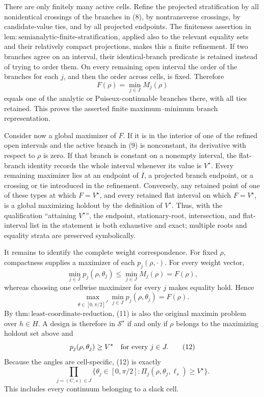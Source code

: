 There are only finitely many active cells.  Refine the projected stratification by all nonidentical crossings of the branches in (8), by nontransverse crossings, by candidate-value ties, and by all projected endpoints.  The finiteness assertion in \(\mathrm{lem{:}semianalytic\mbox{-}finite\mbox{-}stratification}\), applied also to the relevant equality sets and their relatively compact projections, makes this a finite refinement.  If two branches agree on an interval, their identical-branch predicate is retained instead of trying to order them.  On every remaining open interval the order of the branches for each \(j\), and then the order across cells, is fixed.  Therefore
\[
F(\rho)=\min_{j\in J}M_j(\rho)                                    \tag{9}
\]
equals one of the analytic or Puiseux-continuable branches there, with all ties retained.  This proves the asserted finite maximum--minimum branch representation.

Consider now a global maximizer of \(F\).  If it is in the interior of one of the refined open intervals and the active branch in (9) is nonconstant, its derivative with respect to \(\rho\) is zero.  If that branch is constant on a nonempty interval, the flat-branch identity records the whole interval whenever its value is \(V^{\star}\).  Every remaining maximizer lies at an endpoint of \(I\), a projected branch endpoint, or a crossing or tie introduced in the refinement.  Conversely, any retained point of one of these types at which \(F=V^{\star}\), and every retained flat interval on which \(F=V^{\star}\), is a global maximizing holdout by the definition of \(V^{\star}\).  Thus, with the qualification ``attaining \(V^{\star}\)'', the endpoint, stationary-root, intersection, and flat-interval list in the statement is both exhaustive and exact; multiple roots and equality strata are preserved symbolically.

It remains to identify the complete weight correspondence.  For fixed \(\rho\), compactness supplies a maximizer of each \(p_j(\rho,\cdot)\).  For every weight vector,
\[
\min_{j\in J}p_j(\rho,\theta_j)
\leq \min_{j\in J}M_j(\rho)=F(\rho),                              \tag{10}
\]
whereas choosing one cellwise maximizer for every \(j\) makes equality hold.  Hence
\[
\max_{\theta\in[0,\pi/2]^J}
   \min_{j\in J}p_j(\rho,\theta_j)=F(\rho).                       \tag{11}
\]
By \(\mathrm{thm{:}least\mbox{-}coordinate\mbox{-}reduction}\), (11) is also the original maximin problem over \(h\in H\).  A design is therefore in \(\mathcal S^{\star}\) if and only if \(\rho\) belongs to the maximizing holdout set above and
\[
p_j(\rho,\theta_j)\geq V^{\star}
\quad\hbox{for every }j\in J.                                     \tag{12}
\]
Because the angles are cell-specific, (12) is exactly
\[
\prod_{j=(C,s)\in J}
 \{\theta_j\in[0,\pi/2]:
      \Pi_j(\rho,\theta_j,\ell_s)\geq V^{\star}\}.               \tag{13}
\]
This includes every continuum belonging to a slack cell.


